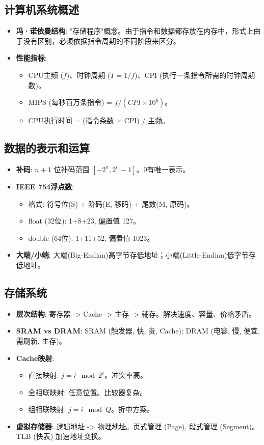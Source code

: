 \documentclass[cn,hazy,blue,12pt,screen,normal]{elegantnote}
\begin{document}
\subsection{计算机系统概述}
\begin{itemize}
    \item \textbf{冯·诺依曼结构}: "存储程序"概念。由于指令和数据都存放在内存中，形式上由于没有区别，必须依据指令周期的不同阶段来区分。
    \item \textbf{性能指标}:
    \begin{itemize}
        \item CPU主频 ($f$)、时钟周期 ($T=1/f$)、CPI (执行一条指令所需的时钟周期数)。
        \item MIPS (每秒百万条指令) = $f / (CPI \times 10^6)$。
        \item CPU执行时间 = (指令条数 $\times$ CPI) / 主频。
    \end{itemize}
\end{itemize}

\subsection{数据的表示和运算}
\begin{itemize}
    \item \textbf{补码}: $n+1$ 位补码范围 $[-2^n, 2^n-1]$。0有唯一表示。
    \item \textbf{IEEE 754浮点数}:
    \begin{itemize}
        \item 格式: 符号位(S) + 阶码(E, 移码) + 尾数(M, 原码)。
        \item float (32位): 1+8+23, 偏置值 127。
        \item double (64位): 1+11+52, 偏置值 1023。
    \end{itemize}
    \item \textbf{大端/小端}: 大端(Big-Endian)高字节存低地址；小端(Little-Endian)低字节存低地址。
\end{itemize}

\subsection{存储系统}
\begin{itemize}
    \item \textbf{层次结构}: 寄存器 -> Cache -> 主存 -> 辅存。解决速度、容量、价格矛盾。
    \item \textbf{SRAM vs DRAM}: SRAM (触发器, 快, 贵, Cache); DRAM (电容, 慢, 便宜, 需刷新, 主存)。
    \item \textbf{Cache映射}:
    \begin{itemize}
        \item 直接映射: $j = i \mod 2^c$。冲突率高。
        \item 全相联映射: 任意位置。比较器复杂。
        \item 组相联映射: $j = i \mod Q$。折中方案。
    \end{itemize}
    \item \textbf{虚拟存储器}: 逻辑地址 -> 物理地址。页式管理 (Page), 段式管理 (Segment)。TLB (快表) 加速地址变换。
\end{itemize}
\end{document}
